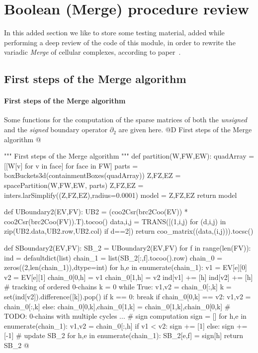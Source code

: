 \documentclass[11pt,oneside]{article}    %
\begin{document}
\section{Boolean (Merge) procedure review}

In this added section we like to store some testing material, added while performing a deep review of the code of this module, in order to rewrite the variadic \emph{Merge} of cellular complexes, according to paper~\cite{2017arXiv170400142P}.

\subsection{First steps of the Merge algorithm}

\paragraph{First steps of the Merge algorithm}
Some functions for the computation of the sparse matrices of both the \emph{unsigned} and the \emph{signed} boundary operator $\partial_2$ are given here.
@D First steps of the Merge algorithm
@{""" First steps of the Merge algorithm """    
def partition(W,FW,EW):
    quadArray = [[W[v] for v in face] for face in FW]
    parts = boxBuckets3d(containmentBoxes(quadArray))
    Z,FZ,EZ = spacePartition(W,FW,EW, parts)
    Z,FZ,EZ = inters.larSimplify((Z,FZ,EZ),radius=0.0001)
    model = Z,FZ,EZ
    return model

def UBoundary2(EV,FV):
	UB2 = (coo2Csr(brc2Coo(EV)) * coo2Csr(brc2Coo(FV)).T).tocoo()
	data,i,j = TRANS([(1,i,j) for (d,i,j) in zip(UB2.data,UB2.row,UB2.col) if d==2])
	return coo_matrix((data,(i,j))).tocsc()

def SBoundary2(EV,FV):
	SB_2 = UBoundary2(EV,FV)
	for f in range(len(FV)):
		ind = defaultdict(list)
		chain_1 = list(SB_2[:,f].tocoo().row)
		chain_0 = zeros((2,len(chain_1)),dtype=int)
		for h,e in enumerate(chain_1):
			v1 = EV[e][0]
			v2 = EV[e][1]
			chain_0[0,h] = v1
			chain_0[1,h] = v2
			ind[v1] += [h]
			ind[v2] += [h]
		# tracking of ordered 0-chains
		k = 0
		while True:
			v1,v2 = chain_0[:,k]
			k = set(ind[v2]).difference([k]).pop()
			if k == 0: break
			if chain_0[0,k] == v2:
				v1,v2 = chain_0[:,k]
			else:
				chain_0[0,k],chain_0[1,k] = chain_0[1,k],chain_0[0,k]
		# TODO: 0-chains with multiple cycles ...
		# sign computation
		sign = []
		for h,e in enumerate(chain_1):
			v1,v2 = chain_0[:,h]
			if v1 < v2:
				sign += [1]
			else:
				sign += [-1]
		# update SB_2
		for h,e in enumerate(chain_1):
			SB_2[e,f] = sign[h]
	return SB_2
@}
\end{document}
